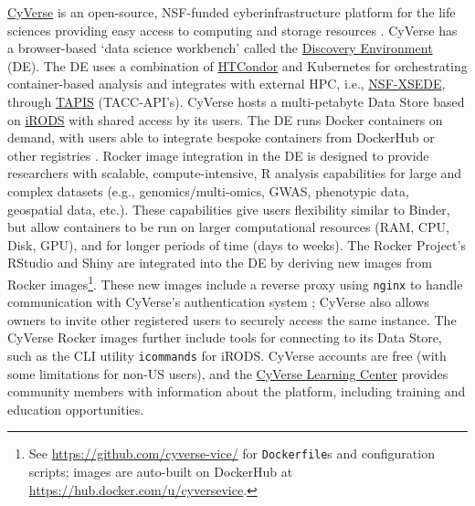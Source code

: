 \href{https://cyverse.org}{CyVerse} is an open-source, NSF-funded
cyberinfrastructure platform for the life sciences providing easy access
to computing and storage resources \citep{merchant_iplant_2016}. CyVerse
has a browser-based `data science workbench' called the
\href{https://cyverse.org/discovery-environment}{Discovery Environment}
(DE). The DE uses a combination of
\href{https://research.cs.wisc.edu/htcondor/}{HTCondor} and Kubernetes
for orchestrating container-based analysis and integrates with external
HPC, i.e., \href{https://www.xsede.org/}{NSF-XSEDE}, through
\href{https://www.tacc.utexas.edu/tapis}{TAPIS} (TACC-API's). CyVerse
hosts a multi-petabyte Data Store based on
\href{https://irods.org/}{iRODS} with shared access by its users. The DE
runs Docker containers on demand, with users able to integrate bespoke
containers from DockerHub or other registries
\citep{devisetty_bringing_2016}. Rocker image integration in the DE is
designed to provide researchers with scalable, compute-intensive, R
analysis capabilities for large and complex datasets (e.g.,
genomics/multi-omics, GWAS, phenotypic data, geospatial data, etc.).
These capabilities give users flexibility similar to Binder, but allow
containers to be run on larger computational resources (RAM, CPU, Disk,
GPU), and for longer periods of time (days to weeks). The Rocker
Project's RStudio and Shiny are integrated into the DE by deriving new
images from Rocker
images\footnote{See \href{https://github.com/cyverse-vice/}{https://github.com/cyverse-vice/} for \texttt{Dockerfile}s and configuration scripts; images are auto-built on DockerHub at \href{https://hub.docker.com/u/cyversevice}{https://hub.docker.com/u/cyversevice}.}.
These new images include a reverse proxy using \texttt{nginx} to handle
communication with CyVerse's authentication system
\citep{rstudio_proxy_2020}; CyVerse also allows owners to invite other
registered users to securely access the same instance. The CyVerse
Rocker images further include tools for connecting to its Data Store,
such as the CLI utility \texttt{icommands} for iRODS. CyVerse accounts
are free (with some limitations for non-US users), and the
\href{https://learning.cyverse.org/}{CyVerse Learning Center} provides
community members with information about the platform, including
training and education opportunities.

